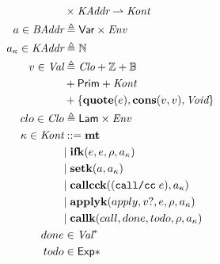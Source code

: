 \documentclass[12pt,draft]{article}
\newcommand{\callccsyn}[1]{(\texttt{call/cc}\;#1)}
\begin{document}
\begin{multicols*}{2}
\begin{align*}
    & \times \cKAddr \rightharpoonup \cKont \\
    a \in \cBAddr &\triangleq \cVar \times \cEnv \\
    \ckaddr \in \cKAddr &\triangleq \mathbb{N} \\
    v \in \cVal &\triangleq \cClo + \mathbb{Z} + \mathbb{B} \\
                        & + \cPrim + \cKont \\
                        & + \{\textbf{quote}(e) , \textbf{cons}(v , v) ,
                          \textit{Void}\} \\
    clo \in \cClo &\triangleq \cLam \times \cEnv \\
    \ckont \in \cKont &::= \textbf{mt} \\
                        &|\; \textbf{ifk}(e , e , \cenv , \ckaddr) \\
                        &|\; \textbf{setk}(a, \ckaddr) \\
                        &|\; \textbf{callcck}(\callccsyn{e} , \ckaddr) \\
                        &|\; \textbf{applyk}(apply, v? , e , \cenv , \ckaddr) \\
                        &|\; \textbf{callk}(call,done,todo,\cenv,\ckaddr) \\
    done &\in \cVal^* \\
    todo &\in \cExp* \\
  \end{align*}
\end{multicols*}


\newpage
\end{document}
